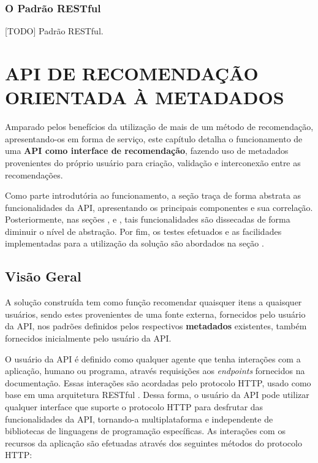 \documentclass[12pt, openright, oneside, a4paper, brazil]{abntex2}
\begin{document}
\subsection{O Padrão RESTful}

[TODO] Padrão RESTful.

%
%

\chapter{API DE RECOMENDAÇÃO ORIENTADA À METADADOS}

Amparado pelos benefícios da utilização de mais de um método de recomendação, apresentando-os em forma de serviço, este capítulo detalha o funcionamento de uma \textbf{API como interface de recomendação}, fazendo uso de metadados provenientes do próprio usuário para criação, validação e interconexão entre as recomendações.

Como parte introdutória ao funcionamento, a seção  traça de forma abstrata as funcionalidades da API, apresentando os principais componentes e sua correlação. Posteriormente, nas seções ,  e , tais funcionalidades são dissecadas de forma diminuir o nível de abstração. Por fim, os testes efetuados e as facilidades implementadas para a utilização da solução são abordados na seção .

\section{Visão Geral} \label{visao_geral}

A solução construída tem como função recomendar quaisquer itens a quaisquer usuários, sendo estes provenientes de uma fonte externa, fornecidos pelo usuário da API, nos padrões definidos pelos respectivos \textbf{metadados} existentes, também fornecidos inicialmente pelo usuário da API.

O usuário da API é definido como qualquer agente que tenha interações com a aplicação, humano ou programa, através requisições aos \textit{endpoints} fornecidos na documentação. Essas interações são acordadas pelo protocolo HTTP, usado como base em uma arquitetura RESTful \cite{rodriguez2008restful}. Dessa forma, o usuário da API pode utilizar qualquer interface que suporte o protocolo HTTP para desfrutar das funcionalidades da API, tornando-a multiplataforma e independente de bibliotecas de linguagens de programação específicas. As interações com os recursos da aplicação são efetuadas através dos seguintes métodos do protocolo HTTP:
\end{document}
